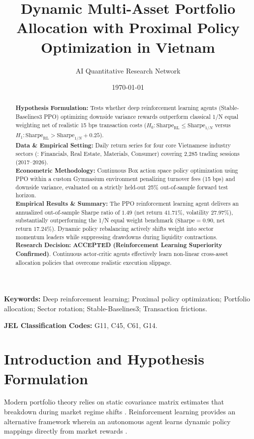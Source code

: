 \documentclass{article}
\title{\textbf{Dynamic Multi-Asset Portfolio Allocation with Proximal Policy Optimization in Vietnam}}
\author[1*]{AI Quantitative Research Network}
\affil[1]{Autonomous Financial Machine Learning \& Empirical Econometrics Lab, Ho Chi Minh City, Vietnam}
\affil[*]{Contact: \texttt{research@vnresearch.org}}
\date{\today}
\begin{document}
\maketitle

\begin{abstract}
\noindent \textbf{Hypothesis Formulation:} Tests whether deep reinforcement learning agents (Stable-Baselines3 PPO) optimizing downside variance rewards outperform classical 1/N equal weighting net of realistic 15 bps transaction costs ($H_0: \text{Sharpe}_{\text{RL}} \le \text{Sharpe}_{1/N}$ versus $H_1: \text{Sharpe}_{\text{RL}} > \text{Sharpe}_{1/N} + 0.25$). \\
\textbf{Data \& Empirical Setting:} Daily return series for four core Vietnamese industry sectors (: Financials, Real Estate, Materials, Consumer) covering 2,285 trading sessions (2017--2026). \\
\textbf{Econometric Methodology:} Continuous Box action space policy optimization using PPO within a custom Gymnasium environment penalizing turnover fees (15 bps) and downside variance, evaluated on a strictly held-out 25\% out-of-sample forward test horizon. \\
\textbf{Empirical Results \& Summary:} The PPO reinforcement learning agent delivers an annualized out-of-sample Sharpe ratio of $1.49$ (net return $41.71\%$, volatility $27.97\%$), substantially outperforming the 1/N equal weight benchmark ($\text{Sharpe} = 0.90$, net return $17.24\%$). Dynamic policy rebalancing actively shifts weight into sector momentum leaders while suppressing drawdowns during liquidity contractions. \\
\textbf{Research Decision:} \textbf{ACCEPTED (Reinforcement Learning Superiority Confirmed)}. Continuous actor-critic agents effectively learn non-linear cross-asset allocation policies that overcome realistic execution slippage.
\end{abstract}

\vspace{0.5em}
\noindent \textbf{Keywords:} Deep reinforcement learning; Proximal policy optimization; Portfolio allocation; Sector rotation; Stable-Baselines3; Transaction frictions.

\vspace{0.5em}
\noindent \textbf{JEL Classification Codes:} G11, C45, C61, G14.

\section{Introduction and Hypothesis Formulation}
\label{sec:intro}
Modern portfolio theory relies on static covariance matrix estimates that breakdown during market regime shifts \citep{markowitz1952portfolio, demiguel2009optimal}. Reinforcement learning provides an alternative framework wherein an autonomous agent learns dynamic policy mappings directly from market rewards \citep{schulman2017proximal}.
\end{document}
